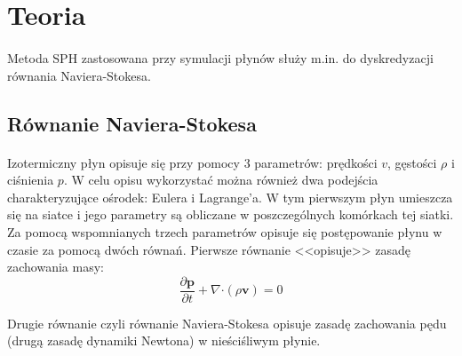\newpage

\section{Teoria}

\paragraph{}
Metoda SPH zastosowana przy symulacji płynów służy m.in. do dyskredyzacji równania Naviera-Stokesa.
\par

\subsection{Równanie Naviera-Stokesa}
\label{subsec:navier_stokes_ss}

\paragraph{}
Izotermiczny płyn opisuje się przy pomocy 3 parametrów: prędkości $v$, gęstości $\rho$ i ciśnienia $p$. W celu opisu wykorzystać można również dwa podejścia charakteryzujące ośrodek: Eulera i Lagrange'a. W tym pierwszym płyn umieszcza się na siatce i jego parametry są obliczane w poszczególnych komórkach tej siatki. Za pomocą wspomnianych trzech parametrów opisuje się postępowanie płynu w czasie za pomocą dwóch równań. Pierwsze równanie <<opisuje>> zasadę zachowania masy:
\begin{equation}
\frac{\partial \boldsymbol{p}}{\partial t} + \nabla \boldsymbol{\cdot} (\rho \boldsymbol{v}) = 0
\label{eqn:mass_conservation}
\end{equation}

Drugie równanie czyli równanie Naviera-Stokesa opisuje zasadę zachowania pędu (drugą zasadę dynamiki Newtona) w nieściśliwym płynie.

